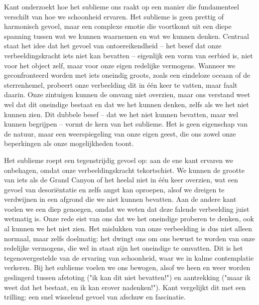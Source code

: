 \begin{mdframed}[leftmargin=0pt,rightmargin=0pt,backgroundcolor=blue!6,linecolor=white,innertopmargin=6pt,innerbottommargin=6pt]

Kant onderzoekt hoe het sublieme ons raakt op een manier die fundamenteel verschilt van hoe we schoonheid ervaren. Het sublieme is geen prettig of harmonisch gevoel, maar een complexe emotie die voortkomt uit een diepe spanning tussen wat we kunnen waarnemen en wat we kunnen denken. Centraal staat het idee dat het gevoel van ontoereikendheid – het besef dat onze verbeeldingskracht iets niet kan bevatten – eigenlijk een vorm van eerbied is, niet voor het object zelf, maar voor onze eigen redelijke vermogens. Wanneer we geconfronteerd worden met iets oneindig groots, zoals een eindeloze oceaan of de sterrenhemel, probeert onze verbeelding dit in één keer te vatten, maar faalt daarin. Onze zintuigen kunnen de omvang niet overzien, maar ons verstand weet wel dat dit oneindige bestaat en dat we het kunnen denken, zelfs als we het niet kunnen zien. Dit dubbele besef – dat we het niet kunnen bevatten, maar wel kunnen begrijpen – vormt de kern van het sublieme. Het is geen eigenschap van de natuur, maar een weerspiegeling van onze eigen geest, die ons zowel onze beperkingen als onze mogelijkheden toont.

Het sublieme roept een tegenstrijdig gevoel op: aan de ene kant ervaren we onbehagen, omdat onze verbeeldingskracht tekortschiet. We kunnen de grootte van iets als de Grand Canyon of het heelal niet in één keer overzien, wat een gevoel van desoriëntatie en zelfs angst kan oproepen, alsof we dreigen te verdwijnen in een afgrond die we niet kunnen bevatten. Aan de andere kant voelen we een diep genoegen, omdat we weten dat deze falende verbeelding juist wetmatig is. Onze rede eist van ons dat we het oneindige proberen te denken, ook al kunnen we het niet zien. Het mislukken van onze verbeelding is dus niet alleen normaal, maar zelfs doelmatig: het dwingt ons om ons bewust te worden van onze redelijke vermogens, die wel in staat zijn het oneindige te omvatten. Dit is het tegenovergestelde van de ervaring van schoonheid, waar we in kalme contemplatie verkeren. Bij het sublieme voelen we ons bewogen, alsof we heen en weer worden geslingerd tussen afstoting ("ik kan dit niet bevatten!") en aantrekking ("maar ik weet dat het bestaat, en ik kan erover nadenken!"). Kant vergelijkt dit met een trilling: een snel wisselend gevoel van afschuw en fascinatie.


\end{mdframed}

